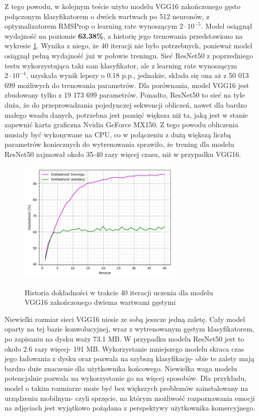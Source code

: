 Z tego powodu, w kolejnym teście użyto modelu VGG16 zakończonego gęsto połączonym klasyfikatorem o dwóch wartwach po 512 neuronów, z optymalizatorem RMSProp o learning rate wynoszącym $2\cdot10^{-5}$. Model osiągnął wydajność na poziomie \textbf{63.38\%}, a historię jego trenowania przedstawiono na wykresie \ref{pic:5.7}. Wynika z niego, że 40 iteracji nie było potrzebnych, ponieważ model osiągnął pełną wydajność już w połowie treningu. Sieć ResNet50 z poprzedniego testu wykorzystująca taki sam klasyfikator, ale z learning rate wynoszącym $2\cdot10^{-4}$, uzyskała wynik lepszy o 0.18 p.p., jednakże, składa się ona aż z 50 013 699 możliwych do trenowania parametrów. Dla porównania, model VGG16 jest zbudowany tylko z 19 173 699 parametrów. Ponadto, ResNet50 to sieć na tyle duża, że do przeprowadzania pojedynczej sekwencji obliczeń, nawet dla bardzo małego wsadu danych, potrzebna jest pamięć większa niż ta, jaką jest w stanie zapewnić karta graficzna Nvidia GeForce MX150. Z tego powodu obliczenia musiały być wykonywane na CPU, co w połączeniu z dużą większą liczbą parametrów koniecznych do wytrenowania sprawiło, że trening dla modelu ResNet50 zajmował około 35-40 razy więcej czasu, niż w przypadku VGG16.

\begin{figure}[H]
    \caption{Historia dokładności w trakcie 40 iteracji uczenia dla modelu VGG16 zakończonego dwiema wartwami gęstymi}
    \centering
    \includegraphics[width=0.7\textwidth]{wykres7.png}
    \label{pic:5.7}
\end{figure}

Niewielki rozmiar sieci VGG16 niesie ze sobą jeszcze jedną zaletę. Cały model oparty na tej bazie konwolucyjnej, wraz z wytrenowanym gęstym klasyfikatorem, po zapisaniu na dysku waży 73.1 MB. W przypadku modelu ResNet50 jest to około 2.6 razy więcej- 191 MB. Wykorzystanie mniejszego modelu skraca czas jego ładowania z dysku oraz pozwala na szybszą klasyfikację- obie te zalety mają bardzo duże znaczenie dla użytkownika końcowego. Niewielka waga modelu potencjalnie pozwala na wykorzystanie go na więcej sposobów. Dla przykładu, model o takim rozmiarze może być bez większych problemów zainstalowany na urządzeniu mobilnym- czyli sprzęcie, na którym możliwość rozpoznawania emocji na zdjęciach jest wyjątkowo pożądana z perspektywy użytkownika komercyjnego.

